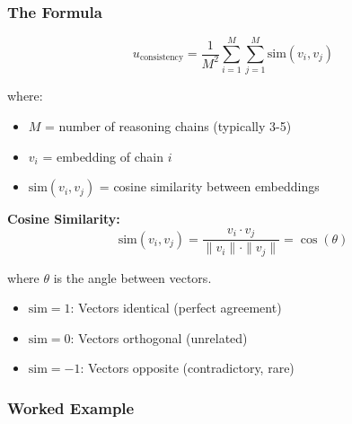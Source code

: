 \documentclass[12pt,a4paper]{article}
\theoremstyle{definition}
\begin{document}
\subsubsection{The Formula}

\begin{equation}
u_{\text{consistency}} = \frac{1}{M^2} \sum_{i=1}^M \sum_{j=1}^M \text{sim}(v_i, v_j)
\end{equation}

where:
\begin{itemize}
    \item $M$ = number of reasoning chains (typically 3-5)
    \item $v_i$ = embedding of chain $i$
    \item $\text{sim}(v_i, v_j)$ = cosine similarity between embeddings
\end{itemize}

\textbf{Cosine Similarity:}
\begin{equation}
\text{sim}(v_i, v_j) = \frac{v_i \cdot v_j}{\|v_i\| \cdot \|v_j\|} = \cos(\theta)
\end{equation}

where $\theta$ is the angle between vectors.

\begin{itemize}
    \item $\text{sim} = 1$: Vectors identical (perfect agreement)
    \item $\text{sim} = 0$: Vectors orthogonal (unrelated)
    \item $\text{sim} = -1$: Vectors opposite (contradictory, rare)
\end{itemize}

\subsubsection{Worked Example}
\end{document}
